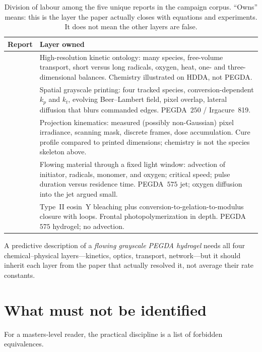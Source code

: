 \begin{table}[htbp]
\centering
\caption{Division of labour among the five unique reports in the campaign corpus.
``Owns'' means: this is the layer the paper actually closes with equations and experiments.
It does not mean the other layers are false.}
\label{tab:papers}
\small
\begin{tabular}{@{}p{}p{}@{}}
\toprule
Report & Layer owned \\
\midrule
\citet{Dobson2024} &
High-resolution kinetic ontology: many species, free-volume transport, short versus long radicals, oxygen, heat, one- and three-dimensional balances.
Chemistry illustrated on HDDA, not PEGDA.
\\
\citet{Montgomery2022} &
Spatial grayscale printing: four tracked species, conversion-dependent $k_p$ and $k_t$, evolving Beer--Lambert field, pixel overlap, lateral diffusion that blurs commanded edges.
PEGDA~$250$ / Irgacure~819.
\\
\citet{Meenakshisundaram2020} &
Projection kinematics: measured (possibly non-Gaussian) pixel irradiance, scanning mask, discrete frames, dose accumulation.
Cure profile compared to printed dimensions; chemistry is not the species skeleton above.
\\
\citet{Slutzky2019} &
Flowing material through a fixed light window: advection of initiator, radicals, monomer, and oxygen; critical speed; pulse duration versus residence time.
PEGDA~$575$ jet; oxygen diffusion into the jet argued small.
\\
\citet{Zhu2020} &
Type~II eosin~Y bleaching plus conversion-to-gelation-to-modulus closure with loops.
Frontal photopolymerization in depth.
PEGDA~$575$ hydrogel; no advection.
\\
\bottomrule
\end{tabular}
\end{table}

A predictive description of a \emph{flowing grayscale PEGDA hydrogel} needs all four chemical--physical layers---kinetics, optics, transport, network---but it should inherit each layer from the paper that actually resolved it, not average their rate constants.

\section{What must not be identified}

For a masters-level reader, the practical discipline is a list of forbidden equivalences.

